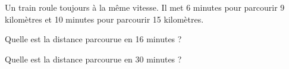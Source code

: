 Un train roule toujours à la même vitesse. Il met 6 minutes pour parcourir 9 kilomètres et 10 minutes pour parcourir 15 kilomètres.
\begin{myenumerate}
  \item Quelle est la distance parcourue en 16 minutes ?
  \item Quelle est la distance parcourue en 30 minutes ?
\end{myenumerate}
